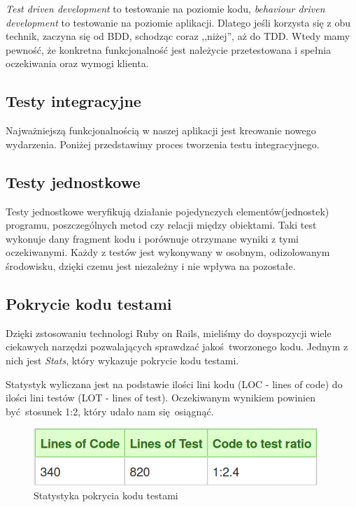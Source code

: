 \begin{itemize}
        \emph{Test driven development} to testowanie na poziomie kodu, \emph{behaviour driven development} to testowanie na poziomie aplikacji. Dlatego jeśli korzysta się z obu technik, zaczyna się od BDD, schodząc coraz ,,niżej'', aż do TDD. Wtedy mamy pewność, że konkretna funkcjonalność jest należycie przetestowana i spełnia oczekiwania oraz wymogi klienta.
    \end{itemize}

  \subsection{Testy integracyjne}
    Najważniejszą funkcjonalnością w naszej aplikacji jest kreowanie nowego wydarzenia. Poniżej przedstawimy proces tworzenia testu integracyjnego.

    
  \subsection{Testy jednostkowe}
    Testy jednostkowe weryfikują działanie pojedynczych elementów(jednostek) programu, poszczególnych metod czy relacji między obiektami. Taki test wykonuje dany fragment kodu i porównuje otrzymane wyniki z tymi oczekiwanymi. Każdy z testów jest wykonywany w osobnym, odizolowanym środowisku, dzięki czemu jest niezależny i nie wpływa na pozostałe.

    
  \clearpage
  \subsection{Pokrycie kodu testami}
    Dzięki zstosowaniu technologi Ruby on Rails, mieliśmy do doyspozycji wiele ciekawych narzędzi pozwalających sprawdzać jakoś tworzonego kodu. Jednym z nich jest \emph{Stats}, który wykazuje pokrycie kodu testami.

    Statystyk wyliczana jest na podstawie ilości lini kodu (LOC - lines of code) do ilości lini testów (LOT - lines of test). Oczekiwanym wynikiem powinien być stosunek 1:2, który udało nam się osiągnąć.
    \begin{figure}[h]
      \centering
      \includegraphics[scale=0.5]{images/loc_table.png}
      \caption{Statystyka pokrycia kodu testami}
    \end{figure}


